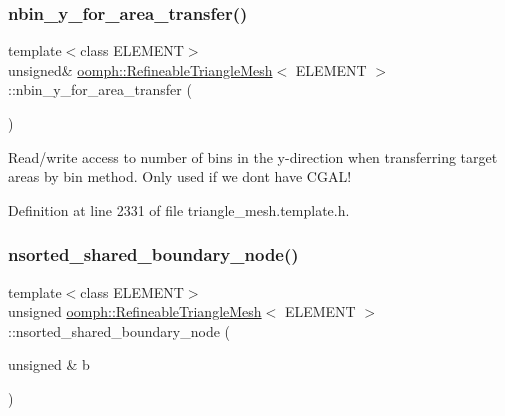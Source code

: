 \subsubsection{\texorpdfstring{nbin\+\_\+y\+\_\+for\+\_\+area\+\_\+transfer()}{nbin\_y\_for\_area\_transfer()}}
{\footnotesize\ttfamily template$<$class E\+L\+E\+M\+E\+NT$>$ \\
unsigned\& \hyperlink{classoomph_1_1RefineableTriangleMesh}{oomph\+::\+Refineable\+Triangle\+Mesh}$<$ E\+L\+E\+M\+E\+NT $>$\+::nbin\+\_\+y\+\_\+for\+\_\+area\+\_\+transfer (\begin{DoxyParamCaption}{ }\end{DoxyParamCaption})\hspace{0.3cm}{\ttfamily [inline]}}



Read/write access to number of bins in the y-\/direction when transferring target areas by bin method. Only used if we don\textquotesingle{}t have C\+G\+A\+L! 



Definition at line 2331 of file triangle\+\_\+mesh.\+template.\+h.

\mbox{\label{classoomph_1_1RefineableTriangleMesh_ad75bed93a7986b69f9bf928d88af294b}} 
\subsubsection{\texorpdfstring{nsorted\+\_\+shared\+\_\+boundary\+\_\+node()}{nsorted\_shared\_boundary\_node()}}
{\footnotesize\ttfamily template$<$class E\+L\+E\+M\+E\+NT$>$ \\
unsigned \hyperlink{classoomph_1_1RefineableTriangleMesh}{oomph\+::\+Refineable\+Triangle\+Mesh}$<$ E\+L\+E\+M\+E\+NT $>$\+::nsorted\+\_\+shared\+\_\+boundary\+\_\+node (\begin{DoxyParamCaption}\item[{unsigned \&}]{b }\end{DoxyParamCaption})\hspace{0.3cm}{\ttfamily [inline]}}



